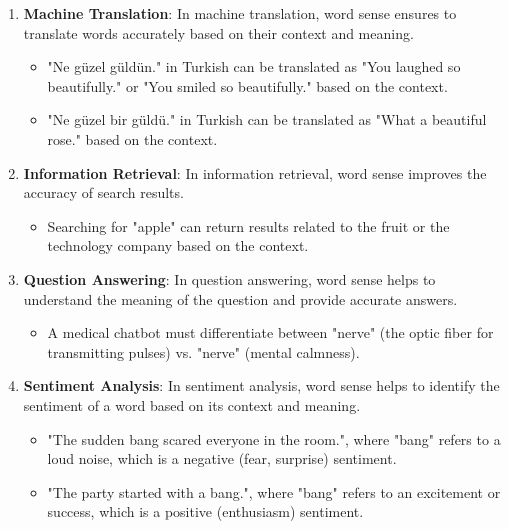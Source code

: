 \documentclass[12pt]{article}
\begin{document}
\begin{description}
  \begin{enumerate}
    \item \textbf{Machine Translation}: In machine translation, word sense ensures to translate words accurately based on their context and meaning.
    
    \begin{itemize}
      \item "Ne güzel güldün." in Turkish can be translated as "You laughed so beautifully." or "You smiled so beautifully." based on the context.
      \item "Ne güzel bir güldü." in Turkish can be translated as "What a beautiful rose." based on the context.
    \end{itemize}
    
    \item \textbf{Information Retrieval}: In information retrieval, word sense improves the accuracy of search results.
  
    \begin{itemize}
      \item Searching for "apple" can return results related to the fruit or the technology company based on the context.
    \end{itemize}
    
    \item \textbf{Question Answering}: In question answering, word sense helps to understand the meaning of the question and provide accurate answers.
    
    \begin{itemize}
      \item A medical chatbot must differentiate between "nerve" (the optic fiber for transmitting pulses) vs. "nerve" (mental calmness).
    \end{itemize}
    
    \item \textbf{Sentiment Analysis}: In sentiment analysis, word sense helps to identify the sentiment of a word based on its context and meaning.
    
    \begin{itemize}
      \item "The sudden bang scared everyone in the room.", where "bang" refers to a loud noise, which is a negative (fear, surprise) sentiment.
      \item "The party started with a bang.", where "bang" refers to an excitement or success, which is a positive (enthusiasm) sentiment.
    \end{itemize}


\end{enumerate}
\end{description}
\end{document}
